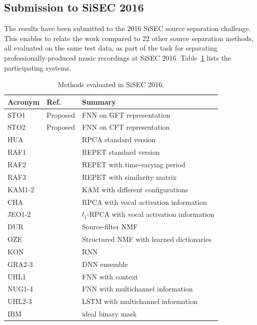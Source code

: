 \subsection{Submission to SiSEC 2016}
\label{ssec:performance}


The results have been submitted to the 2016 SiSEC source separation challenge.
This enables to relate the work compared to $22$ other source separation methods, all evaluated on the same test data, as part of the task for separating professionally-produced music recordings at SiSEC 2016.
Table~\ref{tab:sisec_systems} lists the participating systems.
\begin{table}[htbp]
  \centering
  \scriptsize
    \begin{tabular}{lll@{}}
        \hline
        \textbf{Acronym} & \textbf{Ref.} & \textbf{Summary}\\
        \hline
    STO1 & Proposed & FNN on GFT representation \\
    STO2 & Proposed & FNN on CFT representation \\
        HUA & \cite{huang12} & RPCA standard version \\
        RAF1 & \cite{rafii13} & REPET standard version \\
        RAF2 & \cite{liutkus12} & REPET with time-varying period \\
        RAF3 & \cite{rafii12} & REPET with similarity matrix \\
        KAM1-2 & \cite{liutkus15} & KAM with different configurations \\
        CHA & \cite{chan15} & RPCA with vocal activation information \\
        JEO1-2 & \cite{jeong17} &  $l_1$-RPCA with vocal activation information \\
        DUR & \cite{durrieu11} & Source-filter NMF \\
        OZE & \cite{salaun14} & Structured NMF with learned dictionaries \\
        KON & \cite{huang15} & RNN \\
        GRA2-3 & \cite{grais16} & DNN ensemble \\
        UHL1 & \cite{uhlich15} & FNN with context \\
        NUG1-4 & \cite{nugraha16} & FNN with multichannel information \\
        UHL2-3 & \cite{uhlich17} & LSTM with multichannel information \\
        IBM & & ideal binary mask \\
  \end{tabular}
     \caption{Methods evaluated in SiSEC 2016.}
    \label{tab:sisec_systems}

\end{table}

